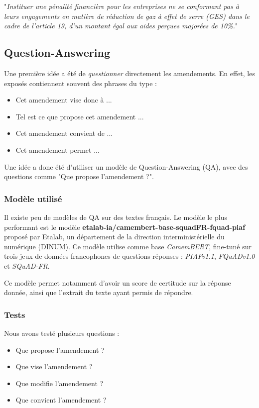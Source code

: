 \documentclass{article}
\begin{document}
"\emph{Instituer une pénalité financière pour les entreprises ne se conformant pas à leurs engagements en matière de réduction de gaz à effet de serre (GES) dans le cadre de l'article 19, d'un montant égal aux aides perçues majorées de 10\%.}"

\subsection{Question-Answering}

Une première idée a été de \emph{questionner} directement les amendements. En effet, les exposés contiennent souvent des phrases du type :
\begin{itemize}
    \item Cet amendement vise donc à ...
    \item Tel est ce que propose cet amendement ...
    \item Cet amendement convient de ...
    \item Cet amendement permet ...
\end{itemize}

Une idée a donc été d'utiliser un modèle de Question-Answering (QA), avec des questions comme "Que propose l'amendement ?".

\subsubsection{Modèle utilisé}

Il existe peu de modèles de QA sur des textes français. Le modèle le plus performant est le modèle \textbf{etalab-ia/camembert-base-squadFR-fquad-piaf} proposé par Etalab, un département de la direction interministérielle du numérique (DINUM).
Ce modèle utilise comme base \emph{CamemBERT}, fine-tuné sur trois jeux de données francophones de questions-réponses : \emph{PIAFv1.1}, \emph{FQuADv1.0} et \emph{SQuAD-FR}.

Ce modèle permet notamment d'avoir un score de certitude sur la réponse donnée, ainsi que l'extrait du texte ayant permis de répondre.

\subsubsection{Tests}

Nous avons testé plusieurs questions :
\begin{itemize}
    \item Que propose l'amendement ?
    \item Que vise l'amendement ?
    \item Que modifie l'amendement ?
    \item Que convient l'amendement ?
\end{itemize}
\end{document}
